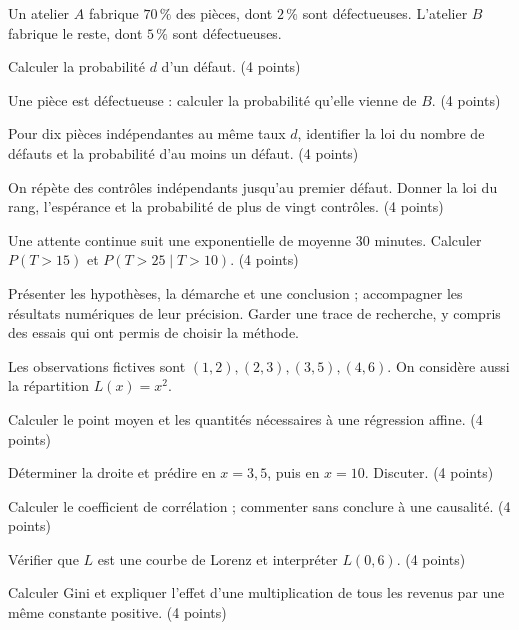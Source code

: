 \label{evaluation-2}
Un atelier $A$ fabrique $70\,\%$ des pièces, dont $2\,\%$ sont défectueuses. L’atelier $B$ fabrique le reste, dont $5\,\%$ sont défectueuses.
\begin{questions}
\item Calculer la probabilité $d$ d’un défaut. \hfill(4 points)
\item Une pièce est défectueuse : calculer la probabilité qu’elle vienne de $B$. \hfill(4 points)
\item Pour dix pièces indépendantes au même taux $d$, identifier la loi du nombre de défauts et la probabilité d’au moins un défaut. \hfill(4 points)
\item On répète des contrôles indépendants jusqu’au premier défaut. Donner la loi du rang, l’espérance et la probabilité de plus de vingt contrôles. \hfill(4 points)
\item Une attente continue suit une exponentielle de moyenne $30$ minutes. Calculer $P(T>15)$ et $P(T>25\mid T>10)$. \hfill(4 points)
\end{questions}
\vspace{5mm}\noindent Présenter les hypothèses, la démarche et une conclusion ; accompagner les résultats numériques de leur précision. Garder une trace de recherche, y compris des essais qui ont permis de choisir la méthode.\par\vfill{}\par\vspace{2mm}\noindent{}
\label{evaluation-3}
Les observations fictives sont $(1,2),(2,3),(3,5),(4,6)$. On considère aussi la répartition $L(x)=x^2$.
\begin{questions}
\item Calculer le point moyen et les quantités nécessaires à une régression affine. \hfill(4 points)
\item Déterminer la droite et prédire en $x=3{,}5$, puis en $x=10$. Discuter. \hfill(4 points)
\item Calculer le coefficient de corrélation ; commenter sans conclure à une causalité. \hfill(4 points)
\item Vérifier que $L$ est une courbe de Lorenz et interpréter $L(0{,}6)$. \hfill(4 points)
\item Calculer Gini et expliquer l’effet d’une multiplication de tous les revenus par une même constante positive. \hfill(4 points)
\end{questions}
